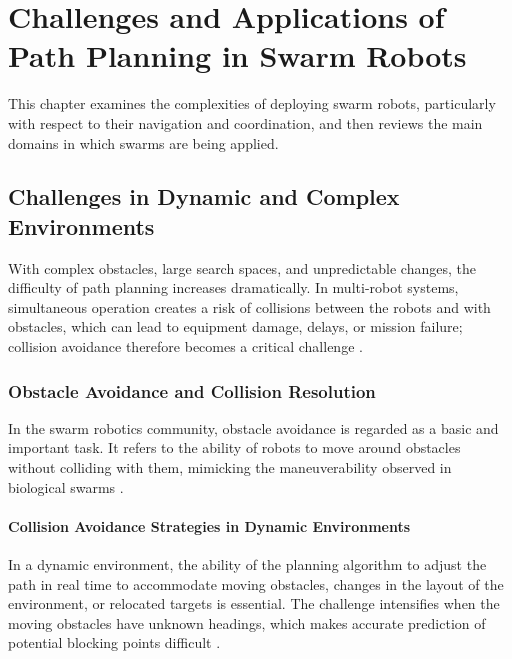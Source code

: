 \chapter{Challenges and Applications of Path Planning in Swarm Robots}\label{chap:challenges}

This chapter examines the complexities of deploying swarm robots, particularly
with respect to their navigation and coordination, and then reviews the main
domains in which swarms are being applied.

\section{Challenges in Dynamic and Complex Environments}\label{sec:dynamic-challenges}

With complex obstacles, large search spaces, and unpredictable changes, the
difficulty of path planning increases dramatically. In multi-robot systems,
simultaneous operation creates a risk of collisions between the robots and with
obstacles, which can lead to equipment damage, delays, or mission failure;
collision avoidance therefore becomes a critical challenge
\cite{oh2025survey,lin2022review}.

\subsection{Obstacle Avoidance and Collision Resolution}

In the swarm robotics community, obstacle avoidance is regarded as a basic and
important task. It refers to the ability of robots to move around obstacles
without colliding with them, mimicking the maneuverability observed in
biological swarms \cite{tan2016handbook}.

\subsubsection{Collision Avoidance Strategies in Dynamic Environments}

In a dynamic environment, the ability of the planning algorithm to adjust the
path in real time to accommodate moving obstacles, changes in the layout of the
environment, or relocated targets is essential. The challenge intensifies when
the moving obstacles have unknown headings, which makes accurate prediction of
potential blocking points difficult \cite{li2021rrt}.

